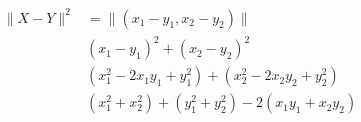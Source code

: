 \documentclass[preview]{standalone}
\begin{document}
\begin{align*}
\lVert X-Y \rVert ^{2}& = \lVert (x_{1}-y_{1},x_{2}-y_{2}) \rVert \\ & (x_{1}-y_{1})^2 + (x_{2}-y_{2})^2 \\ & (x_{1}^2 - 2x_{1}y_{1}+ y_{1}^2)+(x_{2}^2 - 2x_{2}y_{2}+ y_{2}^2) \\ & (x_{1}^2+x_{2}^2)+(y_{1}^2+y_{2}^2) -2(x_{1}y_{1}+x_{2}y_{2})
\end{align*}
\end{document}

